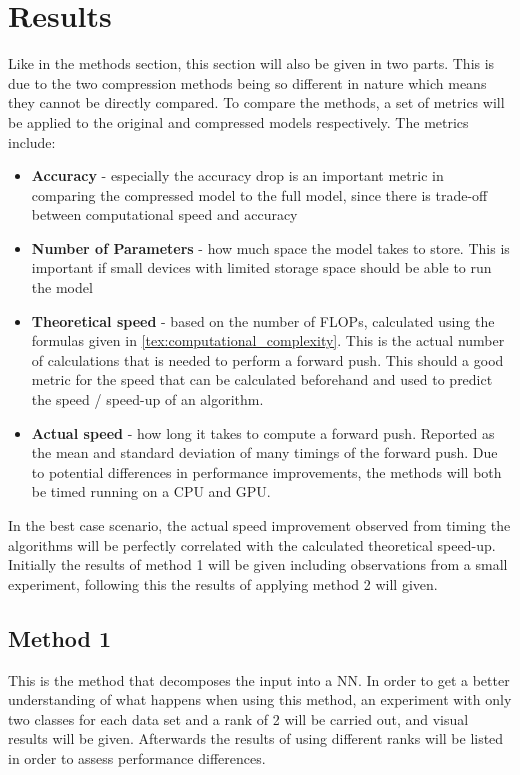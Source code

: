 \section{Results}
Like in the methods section, this section will also be given in two parts. This is due to the two compression methods being so different in nature which means they cannot be directly compared. To compare the methods, a set of metrics will be applied to the original and compressed models respectively. The metrics include:
\begin{itemize}
    \item \textbf{Accuracy} - especially the accuracy drop is an important metric in comparing the compressed model to the full model, since there is trade-off between computational speed and accuracy
    \item \textbf{Number of Parameters} - how much space the model takes to store. This is important if small devices with limited storage space should be able to run the model
    \item \textbf{Theoretical speed} - based on the number of FLOPs, calculated using the formulas given in \autoref{tex:computational_complexity}. This is the actual number of calculations that is needed to perform a forward push. This should a good metric for the speed that can be calculated beforehand and used to predict the speed / speed-up of an algorithm.
    \item \textbf{Actual speed} - how long it takes to compute a forward push. Reported as the mean and standard deviation of many timings of the forward push. Due to potential differences in performance improvements, the methods will both be timed running on a CPU and GPU.
\end{itemize}
In the best case scenario, the actual speed improvement observed from timing the algorithms will be perfectly correlated with the calculated theoretical speed-up. Initially the results of method 1 will be given including observations from a small experiment, following this the results of applying method 2 will given. 

\subsection{Method 1}
This is the method that decomposes the input into a NN. In order to get a better understanding of what happens when using this method, an experiment with only two classes for each data set and a rank of 2 will be carried out, and visual results will be given. Afterwards the results of using different ranks will be listed in order to assess performance differences.

